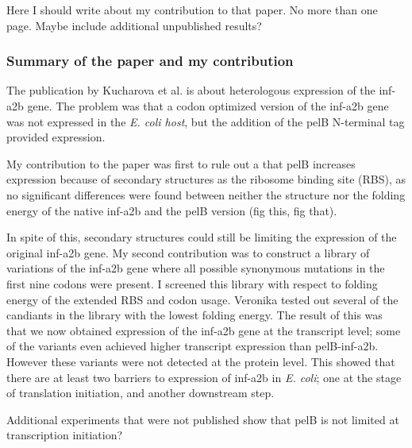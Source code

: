 %
Here I should write about my contribution to that paper. No more than one page.
Maybe include additional unpublished results?

\subsubsection{Summary of the paper and my contribution}
The publication by Kucharova et al. is about heterologous expression of the
inf-a2b gene. The problem was that a codon optimized version of the inf-a2b
gene was not expressed in the \textit{E. coli host}, but the addition of the
pelB N-terminal tag provided expression.

My contribution to the paper was first to rule out a that pelB increases
expression because of secondary structures as the ribosome binding site (RBS),
as no significant differences were found between neither the structure nor the
folding energy of the native inf-a2b and the pelB version (fig this, fig that).

In spite of this, secondary structures could still be limiting the expression
of the original inf-a2b gene. My second contribution was to construct a library
of variations of the inf-a2b gene where all possible synonymous mutations in
the first nine codons were present. I screened this library with respect to
folding energy of the extended RBS and codon usage. Veronika tested out several
of the candiants in the library with the lowest folding energy. The result of
this was that we now obtained expression of the inf-a2b gene at the transcript
level; some of the variants even achieved higher transcript expression than
pelB-inf-a2b. However these variants were not detected at the protein level.
This showed that there are at least two barriers to expression of inf-a2b in
\textit{E. coli}; one at the stage of translation initiation, and another
downstream step.

Additional experiments that were not published show that pelB is not limited
at transcription initiation?
